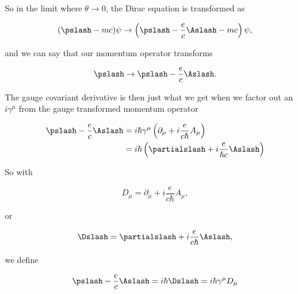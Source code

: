 So in the limit where $\theta \rightarrow 0$, the Dirac equation is transformed as

\begin{equation}\label{eqn:diracCovariant:535}
(\pslash - m c) \psi
\rightarrow
\left(
\pslash - \frac{e}{c} \Aslash - m c
\right) \psi,
\end{equation}

and we can say that our momentum operator transforms

\begin{equation}\label{eqn:diracCovariant:540}
\pslash \rightarrow \pslash - \frac{e}{c} \Aslash.
\end{equation}

The gauge covariant derivative is then just what we get when we factor out an $i\gamma^\mu$ from the gauge transformed momentum operator

\begin{align*}
\pslash - \frac{e}{c} \Aslash 
&= i \hbar \gamma^\mu \left( 
\partial_\mu + i \frac{e}{ c \hbar } A_\mu \right) \\
&=
i \hbar \left( \partialslash + i \frac{ e }{ \hbar c} \Aslash \right)
\end{align*}

So with

\begin{equation}\label{eqn:diracCovariant:550}
D_\mu = 
\partial_\mu + i \frac{e}{ c \hbar } A_\mu,
\end{equation}

or

\begin{equation}\label{eqn:diracCovariant:560}
\Dslash =
\partialslash + i \frac{e}{ c \hbar } \Aslash,
\end{equation}

we define

\begin{equation}\label{eqn:diracCovariant:570}
\pslash - \frac{e}{c} \Aslash = i \hbar \Dslash = i \hbar \gamma^\mu D_\mu
\end{equation}

\EndArticle
